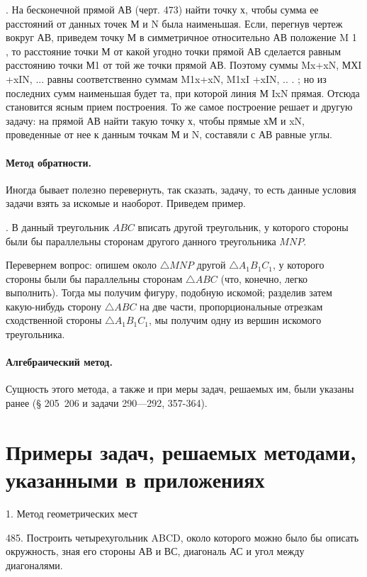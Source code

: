 {. На бесконечной прямой АВ  (черт. 473) найти
точку х, чтобы сумма ее расстояний от данных точек М и N была
наименьшая.
Если, перегнув чертеж вокруг АВ, приведем точку М в симметричное относительно АВ положение M 1 , то расстояние точки М от какой угодно точки прямой АВ сделается равным расстоянию точки М1 от той же точки прямой АВ. Поэтому суммы Mx+xN, МХI +xIN, ... равны соответственно суммам M1x+xN, M1xI +xIN, .. . ; но из последних сумм наименьшая будет та, при которой линия М IxN прямая. Отсюда становится ясным прием построения.
То же самое построение решает и другую задачу: на прямой АВ найти такую точку х, чтобы прямые хМ и xN, проведенные от нее к данным точкам М и N, составяли с АВ равные углы.

\paragraph{Метод обратности.}
Иногда бывает полезно перевернуть, так сказать, задачу, то есть данные условия задачи взять за искомые и наоборот. Приведем пример.

\smallskip

. В данный треугольник $ABC$ вписать другой треугольник, у которого стороны были бы параллельны сторонам другого данного треугольника $MNP$.

Перевернем вопрос: опишем около $\triangle MNP$ другой $\triangle A_1B_1C_1$, у которого стороны были бы параллельны сторонам $\triangle ABC$ (что, конечно, легко выполнить).
Тогда мы получим фигуру, подобную искомой;
разделив затем какую-нибудь сторону $\triangle  ABC$ на две части, пропорциональные отрезкам сходственной стороны $\triangle A_1B_1C_1$, мы получим одну из вершин искомого треугольника.

\paragraph{Алгебраический метод.} Сущность этого метода, а также и при меры задач, решаемых им, были указаны ранее (§ 205\ 206 и задачи 290—292, 357-364).

\section*{Примеры задач, решаемых методами, указанными в приложениях}

1. Метод геометрических мест

485.                       Построить четырехугольник ABCD, около которого можно было бы описать окружность, зная его стороны АВ и ВС, диагональ АС и угол между диагоналями.

}

